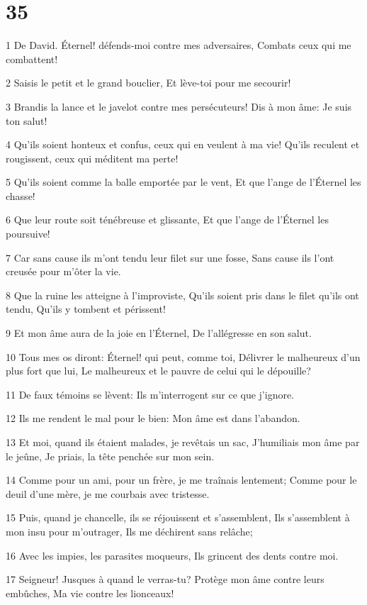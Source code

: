 \chapter{35}

\par 1 De David. Éternel! défends-moi contre mes adversaires, Combats ceux qui me combattent!
\par 2 Saisis le petit et le grand bouclier, Et lève-toi pour me secourir!
\par 3 Brandis la lance et le javelot contre mes persécuteurs! Dis à mon âme: Je suis ton salut!
\par 4 Qu'ils soient honteux et confus, ceux qui en veulent à ma vie! Qu'ils reculent et rougissent, ceux qui méditent ma perte!
\par 5 Qu'ils soient comme la balle emportée par le vent, Et que l'ange de l'Éternel les chasse!
\par 6 Que leur route soit ténébreuse et glissante, Et que l'ange de l'Éternel les poursuive!
\par 7 Car sans cause ils m'ont tendu leur filet sur une fosse, Sans cause ils l'ont creusée pour m'ôter la vie.
\par 8 Que la ruine les atteigne à l'improviste, Qu'ils soient pris dans le filet qu'ils ont tendu, Qu'ils y tombent et périssent!
\par 9 Et mon âme aura de la joie en l'Éternel, De l'allégresse en son salut.
\par 10 Tous mes os diront: Éternel! qui peut, comme toi, Délivrer le malheureux d'un plus fort que lui, Le malheureux et le pauvre de celui qui le dépouille?
\par 11 De faux témoins se lèvent: Ils m'interrogent sur ce que j'ignore.
\par 12 Ils me rendent le mal pour le bien: Mon âme est dans l'abandon.
\par 13 Et moi, quand ils étaient malades, je revêtais un sac, J'humiliais mon âme par le jeûne, Je priais, la tête penchée sur mon sein.
\par 14 Comme pour un ami, pour un frère, je me traînais lentement; Comme pour le deuil d'une mère, je me courbais avec tristesse.
\par 15 Puis, quand je chancelle, ils se réjouissent et s'assemblent, Ils s'assemblent à mon insu pour m'outrager, Ils me déchirent sans relâche;
\par 16 Avec les impies, les parasites moqueurs, Ils grincent des dents contre moi.
\par 17 Seigneur! Jusques à quand le verras-tu? Protège mon âme contre leurs embûches, Ma vie contre les lionceaux!
